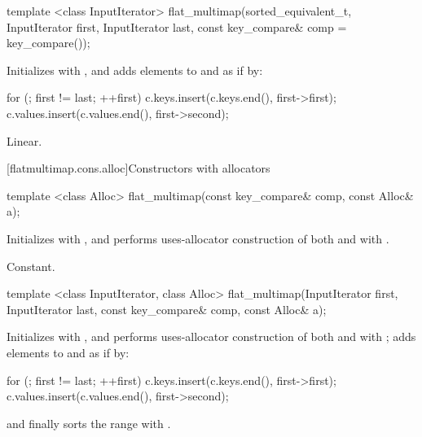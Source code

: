 \begin{codeblock}
\begin{codeblock}
\begin{codeblock}
\begin{addedblock}
%
\begin{itemdecl}
template <class InputIterator>
  flat_multimap(sorted_equivalent_t, InputIterator first, InputIterator last,
                const key_compare& comp = key_compare());
\end{itemdecl}

\begin{itemdescr}
\pnum
\effects Initializes  with , and adds elements to
 and  as if by:
\begin{codeblock}
for (; first != last; ++first) {
  c.keys.insert(c.keys.end(), first->first);
  c.values.insert(c.values.end(), first->second);
}
\end{codeblock}

\pnum
\complexity
Linear.
\end{itemdescr}

[flatmultimap.cons.alloc]{Constructors with allocators}

%
\begin{itemdecl}
template <class Alloc>
  flat_multimap(const key_compare& comp, const Alloc& a);
\end{itemdecl}

\begin{itemdescr}
\pnum
\effects Initializes  with , and performs
uses-allocator construction of both
 and  with .

\pnum
\complexity
Constant.
\end{itemdescr}

%
\begin{itemdecl}
template <class InputIterator, class Alloc>
  flat_multimap(InputIterator first, InputIterator last,
                const key_compare& comp, const Alloc& a);
\end{itemdecl}

\begin{itemdescr}
\pnum
\effects Initializes  with , and performs
uses-allocator construction of both
 and  with ; adds elements to
 and  as if by:
\begin{codeblock}
for (; first != last; ++first) {
  c.keys.insert(c.keys.end(), first->first);
  c.values.insert(c.values.end(), first->second);
}
\end{codeblock}
and finally sorts the range  with .


\end{itemdescr}
\end{addedblock}
\end{codeblock}
\end{codeblock}
\end{codeblock}
